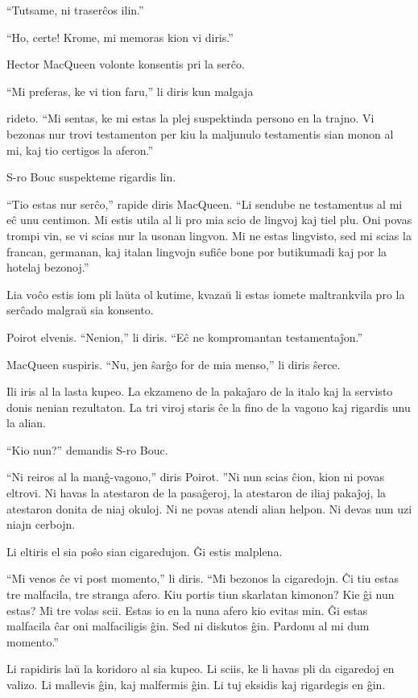 ``Tutsame, ni traserĉos ilin.''

``Ho, certe! Krome, mi memoras kion vi diris.''

Hector MacQueen volonte konsentis pri la serĉo.

``Mi preferas, ke vi tion faru,'' li diris kun malgaja

rideto. ``Mi sentas, ke mi estas la plej suspektinda persono en la trajno. Vi bezonas nur trovi testamenton per kiu la maljunulo testamentis sian monon al mi, kaj tio certigos la aferon.''

S-ro Bouc suspekteme rigardis lin.

``Tio estas nur serĉo,'' rapide diris MacQueen. ``Li sendube ne testamentus al mi eĉ unu centimon. Mi estis utila al li pro mia scio de lingvoj kaj tiel plu. Oni povas trompi vin, se vi scias nur la usonan lingvon. Mi ne estas lingvisto, sed mi scias la francan, germanan, kaj italan lingvojn sufiĉe bone por butikumadi kaj por la hotelaj bezonoj.''

Lia voĉo estis iom pli laŭta ol kutime, kvazaŭ li estas iomete maltrankvila pro la serĉado malgraŭ sia konsento.

Poirot elvenis. ``Nenion,'' li diris. ``Eĉ ne kompromantan testamentaĵon.''

MacQueen suspiris. ``Nu, jen ŝarĝo for de mia menso,'' li diris ŝerce.

Ili iris al la lasta kupeo. La ekzameno de la pakaĵaro de la italo kaj la servisto donis nenian rezultaton. La tri viroj staris ĉe la fino de la vagono kaj rigardis unu la alian.

``Kio nun?'' demandis S-ro Bouc.

``Ni reiros al la manĝ-vagono,'' diris Poirot. ''Ni nun scias ĉion, kion ni povas eltrovi. Ni havas la atestaron de la pasaĝeroj, la atestaron de iliaj pakaĵoj, la atestaron donita de niaj okuloj. Ni ne povas atendi alian helpon. Ni devas nun uzi niajn cerbojn.

Li eltiris el sia poŝo sian cigaredujon. Ĝi estis malplena.

``Mi venos ĉe vi post momento,'' li diris. ``Mi bezonos la cigaredojn. Ĉi tiu estas tre malfacila, tre stranga afero. Kiu portis tiun skarlatan kimonon? Kie ĝi nun estas? Mi tre volas scii. Estas io en la nuna afero kio evitas min. Ĝi estas malfacila ĉar oni malfaciligis ĝin. Sed ni diskutos ĝin. Pardonu al mi dum momento.''

Li rapidiris laŭ la koridoro al sia kupeo. Li sciis, ke li havas pli da cigaredoj en valizo. Li mallevis ĝin, kaj malfermis ĝin. Li tuj eksidis kaj rigardegis en ĝin.

